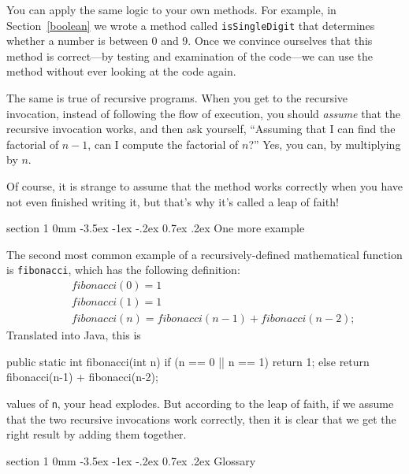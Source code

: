 \documentclass{book}
\makeatletter
\renewcommand{\section}{\@startsection 
    {section} {1} {0mm}%
    {-3.5ex \@plus -1ex \@minus -.2ex}%
    {0.7ex \@plus.2ex}%
    {\normalfont\Large\bfseries}}
\makeatother
\begin{document}
You can apply the same logic to your own methods.
For example, in Section~\ref{boolean} we wrote a method called
{\tt isSingleDigit} that determines whether a number is between
0 and 9.  Once we convince ourselves that this method
is correct---by testing and examination of the code---we can
use the method without ever looking at the code again.

The same is true of recursive programs.  When you get to
the recursive invocation, instead of following the flow of
execution, you should {\em assume} that the recursive invocation
works, and then ask yourself,
``Assuming that I can find the factorial of $n-1$, can I
compute the factorial of $n$?''  Yes, you can, by multiplying by $n$.

Of course, it is strange to assume that the method
works correctly when you have not even finished writing it,
but that's why it's called a leap of faith!


\section{One more example}
\label{factorial}

The second most common example of a recursively-defined
mathematical function is {\tt fibonacci}, which has the
following definition:
%
\begin{eqnarray*}
&& fibonacci(0) = 1 \\
&& fibonacci(1) = 1 \\
&& fibonacci(n) = fibonacci(n-1) + fibonacci(n-2);
\end{eqnarray*}
%
Translated into Java, this is

\begin{verbatimtab}
  public static int fibonacci(int n) {
    if (n == 0 || n == 1) {
      return 1;
    } else {
      return fibonacci(n-1) + fibonacci(n-2);
    }
  }
\end{verbatimtab}
values of {\tt n}, your head explodes.  But according to the leap of
faith, if we assume that the two recursive invocations work correctly, then
it is clear that we get the right result by adding them together.


\section{Glossary}
\end{document}
